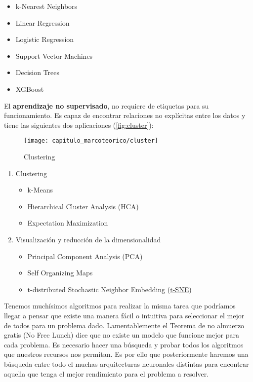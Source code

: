 \begin{itemize}
    \item k-Nearest Neighbors
    \item Linear Regression
    \item Logistic Regression
    \item Support Vector Machines
    \item Decision Trees
    \item XGBoost
\end{itemize} 

El \textbf{aprendizaje no supervisado}, no requiere de etiquetas para su
funcionamiento. Es capaz de encontrar relaciones no explícitas entre los datos y
tiene las siguientes dos aplicaciones (\autoref{fig:cluster}):

\begin{figure}[H]
    \centering
    \texttt{[image: capitulo\_marcoteorico/cluster]}
    \caption{Clustering}\label{fig:cluster}
\end{figure}

\begin{enumerate}
    \item Clustering
    \begin{itemize}
        \item k-Means
        \item Hierarchical Cluster Analysis (HCA)
        \item Expectation Maximization
    \end{itemize}
    \item Visualización y reducción de la dimensionalidad
    \begin{itemize}
        \item Principal Component Analysis (PCA)
        \item Self Organizing Maps
        \item t-distributed Stochastic Neighbor Embedding (\hyperlink{abbr}{t-SNE})
    \end{itemize}
\end{enumerate}

Tenemos muchísimos algoritmos para realizar la misma tarea que podríamos llegar
a pensar que existe una manera fácil o intuitiva para seleccionar el mejor de
todos para un problema dado. Lamentablemente el Teorema de no almuerzo gratis
(No Free Lunch) dice que no existe un modelo que funcione mejor para cada
problema. Es necesario hacer una búsqueda y probar todos los algoritmos que
nuestros recursos nos permitan. Es por ello que posteriormente haremos una
búsqueda entre todo el muchas arquitecturas neuronales distintas para encontrar
aquella que tenga el mejor rendimiento para el problema a resolver. 

